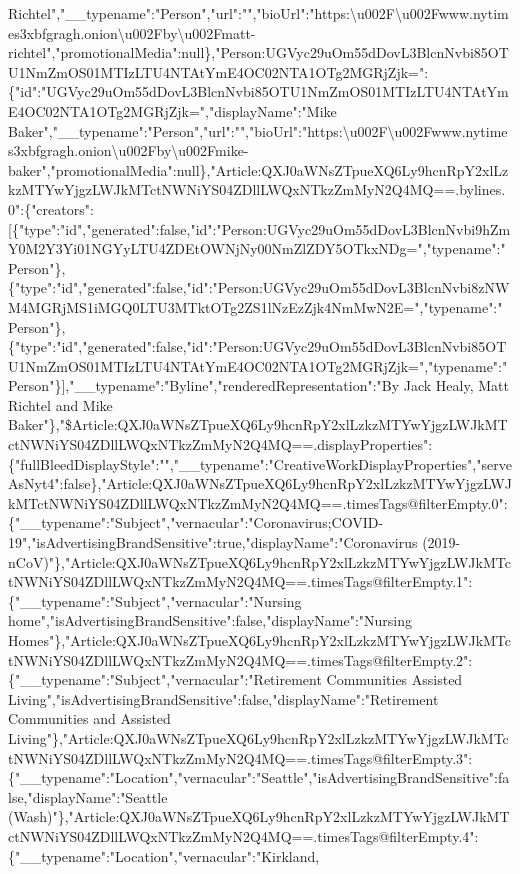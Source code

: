 Richtel","\_\_typename":"Person","url":"","bioUrl":"https:\textbackslash{}u002F\textbackslash{}u002Fwww.nytimes3xbfgragh.onion\textbackslash{}u002Fby\textbackslash{}u002Fmatt-richtel","promotionalMedia":null\},"Person:UGVyc29uOm55dDovL3BlcnNvbi85OTU1NmZmOS01MTIzLTU4NTAtYmE4OC02NTA1OTg2MGRjZjk=":\{"id":"UGVyc29uOm55dDovL3BlcnNvbi85OTU1NmZmOS01MTIzLTU4NTAtYmE4OC02NTA1OTg2MGRjZjk=","displayName":"Mike
Baker","\_\_typename":"Person","url":"","bioUrl":"https:\textbackslash{}u002F\textbackslash{}u002Fwww.nytimes3xbfgragh.onion\textbackslash{}u002Fby\textbackslash{}u002Fmike-baker","promotionalMedia":null\},"Article:QXJ0aWNsZTpueXQ6Ly9hcnRpY2xlLzkzMTYwYjgzLWJkMTctNWNiYS04ZDllLWQxNTkzZmMyN2Q4MQ==.bylines.0":\{"creators":{[}\{"type":"id","generated":false,"id":"Person:UGVyc29uOm55dDovL3BlcnNvbi9hZmY0M2Y3Yi01NGYyLTU4ZDEtOWNjNy00NmZlZDY5OTkxNDg=","typename":"Person"\},\{"type":"id","generated":false,"id":"Person:UGVyc29uOm55dDovL3BlcnNvbi8zNWM4MGRjMS1iMGQ0LTU3MTktOTg2ZS1lNzEzZjk4NmMwN2E=","typename":"Person"\},\{"type":"id","generated":false,"id":"Person:UGVyc29uOm55dDovL3BlcnNvbi85OTU1NmZmOS01MTIzLTU4NTAtYmE4OC02NTA1OTg2MGRjZjk=","typename":"Person"\}{]},"\_\_typename":"Byline","renderedRepresentation":"By
Jack Healy, Matt Richtel and Mike
Baker"\},"\$Article:QXJ0aWNsZTpueXQ6Ly9hcnRpY2xlLzkzMTYwYjgzLWJkMTctNWNiYS04ZDllLWQxNTkzZmMyN2Q4MQ==.displayProperties":\{"fullBleedDisplayStyle":"","\_\_typename":"CreativeWorkDisplayProperties","serveAsNyt4":false\},"Article:QXJ0aWNsZTpueXQ6Ly9hcnRpY2xlLzkzMTYwYjgzLWJkMTctNWNiYS04ZDllLWQxNTkzZmMyN2Q4MQ==.timesTags@filterEmpty.0":\{"\_\_typename":"Subject","vernacular":"Coronavirus;COVID-19","isAdvertisingBrandSensitive":true,"displayName":"Coronavirus
(2019-nCoV)"\},"Article:QXJ0aWNsZTpueXQ6Ly9hcnRpY2xlLzkzMTYwYjgzLWJkMTctNWNiYS04ZDllLWQxNTkzZmMyN2Q4MQ==.timesTags@filterEmpty.1":\{"\_\_typename":"Subject","vernacular":"Nursing
home","isAdvertisingBrandSensitive":false,"displayName":"Nursing
Homes"\},"Article:QXJ0aWNsZTpueXQ6Ly9hcnRpY2xlLzkzMTYwYjgzLWJkMTctNWNiYS04ZDllLWQxNTkzZmMyN2Q4MQ==.timesTags@filterEmpty.2":\{"\_\_typename":"Subject","vernacular":"Retirement
Communities Assisted
Living","isAdvertisingBrandSensitive":false,"displayName":"Retirement
Communities and Assisted
Living"\},"Article:QXJ0aWNsZTpueXQ6Ly9hcnRpY2xlLzkzMTYwYjgzLWJkMTctNWNiYS04ZDllLWQxNTkzZmMyN2Q4MQ==.timesTags@filterEmpty.3":\{"\_\_typename":"Location","vernacular":"Seattle","isAdvertisingBrandSensitive":false,"displayName":"Seattle
(Wash)"\},"Article:QXJ0aWNsZTpueXQ6Ly9hcnRpY2xlLzkzMTYwYjgzLWJkMTctNWNiYS04ZDllLWQxNTkzZmMyN2Q4MQ==.timesTags@filterEmpty.4":\{"\_\_typename":"Location","vernacular":"Kirkland,
